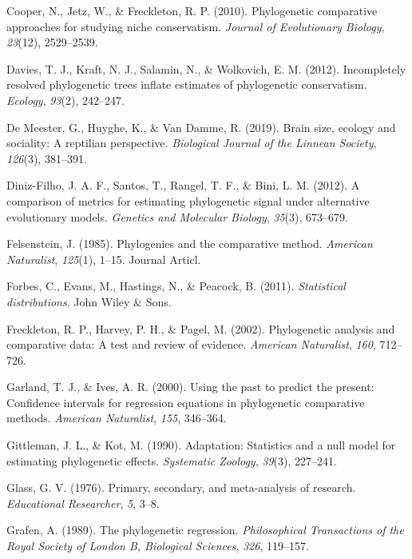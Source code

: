 \documentclass[
]{article}
\begin{document}
\leavevmode\hypertarget{ref-Cooper2010}{}%
Cooper, N., Jetz, W., \& Freckleton, R. P. (2010). Phylogenetic
comparative approaches for studying niche conservatism. \emph{Journal of
Evolutionary Biology}, \emph{23}(12), 2529--2539.

\leavevmode\hypertarget{ref-Davies2012}{}%
Davies, T. J., Kraft, N. J., Salamin, N., \& Wolkovich, E. M. (2012).
Incompletely resolved phylogenetic trees inflate estimates of
phylogenetic conservatism. \emph{Ecology}, \emph{93}(2), 242--247.

\leavevmode\hypertarget{ref-DeMeester2019}{}%
De Meester, G., Huyghe, K., \& Van Damme, R. (2019). Brain size, ecology
and sociality: A reptilian perspective. \emph{Biological Journal of the
Linnean Society}, \emph{126}(3), 381--391.

\leavevmode\hypertarget{ref-DinizFilho2012}{}%
Diniz-Filho, J. A. F., Santos, T., Rangel, T. F., \& Bini, L. M. (2012).
A comparison of metrics for estimating phylogenetic signal under
alternative evolutionary models. \emph{Genetics and Molecular Biology},
\emph{35}(3), 673--679.

\leavevmode\hypertarget{ref-Felsenstein1985}{}%
Felsenstein, J. (1985). Phylogenies and the comparative method.
\emph{American Naturalist}, \emph{125}(1), 1--15. Journal Articl.

\leavevmode\hypertarget{ref-Forbes2011}{}%
Forbes, C., Evans, M., Hastings, N., \& Peacock, B. (2011).
\emph{Statistical distributions}. John Wiley \& Sons.

\leavevmode\hypertarget{ref-Freckleton_et_al2002}{}%
Freckleton, R. P., Harvey, P. H., \& Pagel, M. (2002). Phylogenetic
analysis and comparative data: A test and review of evidence.
\emph{American Naturalist}, \emph{160}, 712--726.

\leavevmode\hypertarget{ref-GarlandIves2000}{}%
Garland, T. J., \& Ives, A. R. (2000). Using the past to predict the
present: Confidence intervals for regression equations in phylogenetic
comparative methods. \emph{American Naturalist}, \emph{155}, 346--364.

\leavevmode\hypertarget{ref-Gittleman1990}{}%
Gittleman, J. L., \& Kot, M. (1990). Adaptation: Statistics and a null
model for estimating phylogenetic effects. \emph{Systematic Zoology},
\emph{39}(3), 227--241.

\leavevmode\hypertarget{ref-Glass1976}{}%
Glass, G. V. (1976). Primary, secondary, and meta-analysis of research.
\emph{Educational Researcher}, \emph{5}, 3--8.

\leavevmode\hypertarget{ref-Grafen1989}{}%
Grafen, A. (1989). The phylogenetic regression. \emph{Philosophical
Transactions of the Royal Society of London B, Biological Sciences},
\emph{326}, 119--157.
\end{document}
